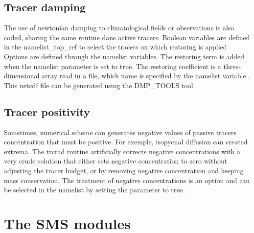 \documentclass[../main/TOP_manual]{subfiles}
\begin{document}
 \subsection{ Tracer damping}


The use of newtonian damping  to climatological fields or observations is also coded, sharing the same routine dans active tracers. Boolean variables are defined in the namelist\_top\_ref to select the tracers on which restoring is applied
Options are defined through the  namelist variables. The restoring term is added when the namelist parameter  is set to true. The restoring coefficient is a three-dimensional array read in a file, which name is specified by the namelist variable . This netcdf file can be generated using the DMP\_TOOLS tool.

 \subsection{ Tracer positivity}


Sometimes, numerical scheme can generates negative values of passive tracers concentration that must be positive. For exemple,  isopycnal diffusion can created extrema. The trcrad routine artificially corrects negative concentrations with a very crude solution that either sets negative concentration to zero without adjusting the tracer budget, or by removing negative concentration and keeping mass conservation.
The treatment of negative concentrations is an option and can be selected in the namelist  by setting the parameter   to true.

\section{The SMS modules}

\label{SMS_models}
\end{document}
